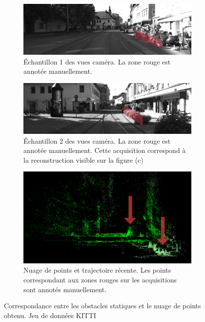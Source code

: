 \begin{figure}
	\begin{center}
		\begin{subfigure}{0.9\textwidth}
			\centering
			\includegraphics[width=\textwidth]{Chapter6/graphics/kitti_obstacles_pict1_scheme.png} 
			\caption{Échantillon 1 des vues caméra. La zone rouge est annotée manuellement.}
		\end{subfigure}	
		\newline
		\begin{subfigure}{0.9\textwidth}
			\centering
			\includegraphics[width=\textwidth]{Chapter6/graphics/kitti_obstacles_pict2_scheme.png} 
			\caption{Échantillon 2 des vues caméra. La zone rouge est annotée manuellement. Cette acquisition correspond à la reconstruction visible sur la figure (c)}
		\end{subfigure}	
		\newline
		\begin{subfigure}{0.9\textwidth}
			\centering
			\includegraphics[width=\textwidth]{Chapter6/graphics/kitti_obstacles_crop_scheme.png} 
			\caption{Nuage de points et trajectoire récente. Les points correspondant aux zones rouges sur les acquisitions sont annotés manuellement.}
		\end{subfigure}
	\end{center}
	\caption{Correspondance entre les obstacles statiques et le nuage de points obtenu. Jeu de données \og KITTI\fg{} \cite{Geiger2012}}
	\label{fig:ch6_KITTI_obstacles}
\end{figure}


